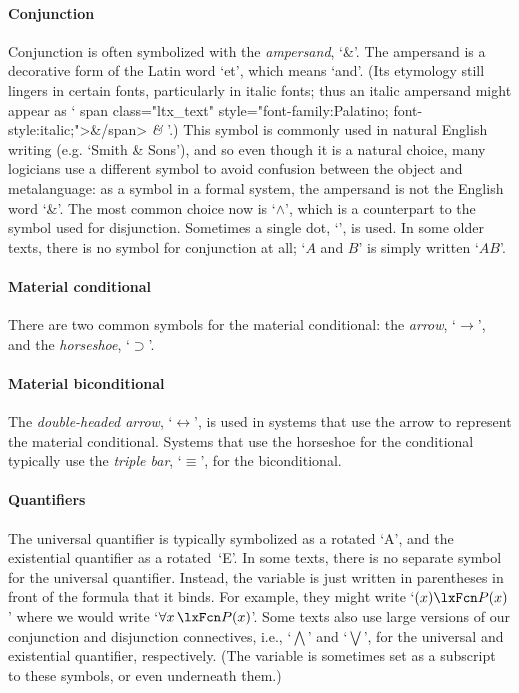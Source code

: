 \paragraph{Conjunction}
Conjunction is often symbolized with the \emph{ampersand}, `{\&}'. The ampersand is a decorative form of the Latin word `et', which means `and'.  (Its etymology still lingers in certain fonts, particularly in italic fonts; thus an italic ampersand might appear as `%
\iflatexml
\<span class="ltx\_text" style="font-family:Palatino; font-style:italic;">\&\</span>
\else
\emph{\&}
\fi
'.) This symbol is commonly used in natural English writing (e.g.  `Smith \& Sons'), and so even though it is a natural choice, many logicians use a different symbol to avoid confusion between the object and metalanguage: as a symbol in a formal system, the ampersand is not the English word `\&'. The most common choice now is `$\wedge$', which is a counterpart to the symbol used for disjunction. Sometimes a single dot, `{\scriptsize\textbullet}', is used. In some older texts, there is no symbol for conjunction at all; `$A$ and $B$' is simply written `$AB$'.

\paragraph{Material conditional} There are two common symbols for the material conditional: the \emph{arrow}, `$\rightarrow$', and the \emph{horseshoe}, `$\supset$'.

\paragraph{Material biconditional} The \emph{double-headed arrow}, `$\leftrightarrow$', is used in systems that use the arrow to represent the material conditional. Systems that use the horseshoe for the conditional typically use the \emph{triple bar}, `$\equiv$', for the biconditional.

\paragraph{Quantifiers} The universal quantifier is typically
symbolized as a rotated `A', and the existential quantifier as a
rotated~`E'. In some texts, there is no separate symbol for the
universal quantifier. Instead, the variable is just written in
parentheses in front of the formula that it binds. For example, they
might write `$(x)\atom{P}{x}$' where we would write `$\forall x\,
\atom{P}{x}$'. Some texts also use large versions of our conjunction
and disjunction connectives, i.e., `$\bigwedge$' and `$\bigvee$', for
the universal and existential quantifier, respectively. (The variable
is sometimes set as a subscript to these symbols, or even underneath
them.)

